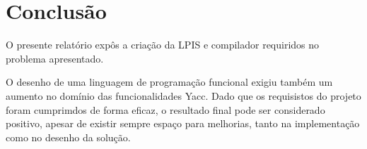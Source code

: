 \chapter*{Conclusão}
\label{concl}

O presente relatório expôs a criação da LPIS e compilador requiridos no problema apresentado.  

O desenho de uma linguagem de programação funcional exigiu também um aumento no domínio 
das funcionalidades Yacc. 
Dado que os requisistos do projeto foram cumprimdos de forma eficaz, o resultado final
pode ser considerado positivo, apesar de existir sempre espaço para melhorias, tanto na 
implementação como no desenho da solução. 

